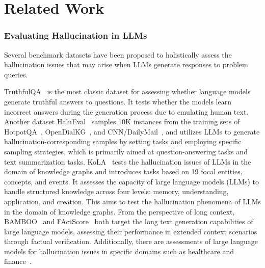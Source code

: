 \section{Related Work}
\subsubsection*{\textbf{Evaluating Hallucination in LLMs}}
Several benchmark datasets have been proposed to holistically assess the hallucination issues that may arise when LLMs generate responses to problem queries. 

TruthfulQA~\cite{lin-etal-2022-truthfulqa} is the most classic dataset for assessing whether language models generate truthful answers to questions. 
It tests whether the models learn incorrect answers during the generation process due to emulating human text. 
Another dataset HaluEval~\cite{HaluEval} samples 10K instances from the training sets of HotpotQA~\cite{yang2018hotpotqa}, OpenDialKG~\cite{moon2019opendialkg}, and CNN/DailyMail~\cite{see2017get}, and utilizes LLMs to generate hallucination-corresponding samples by setting tasks and employing specific sampling strategies, which is primarily aimed at question-answering tasks and text summarization tasks. 
KoLA~\cite{yu2023kola} tests the hallucination issues of LLMs in the domain of knowledge graphs and introduces tasks based on 19 focal entities, concepts, and events. 
It assesses the capacity of large language models (LLMs) to handle structured knowledge across four levels: memory, understanding, application, and creation. 
This aims to test the hallucination phenomena of LLMs in the domain of knowledge graphs. 
From the perspective of long context, BAMBOO~\cite{dong2023bamboo} and FActScore~\cite{min2023factscore} both target the long text generation capabilities of large language models, assessing their performance in extended context scenarios through factual verification. 
Additionally, there are assessments of large language models for hallucination issues in specific domains such as healthcare and finance~\cite{umapathi2023med, kang2023deficiency}.


